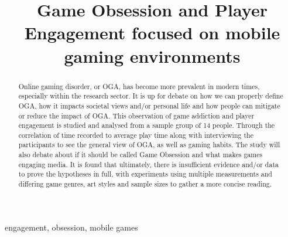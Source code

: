 \documentclass[conference]{IEEEtran}
\begin{document}


\lstset{style=style}

\title{Game Obsession and Player Engagement focused on mobile gaming environments \\
}

\author{
}

\maketitle



\begin{abstract}
Online gaming disorder, or OGA, has become more prevalent in modern times, especially within the research sector. It is up for debate on how we can properly define OGA, how it impacts societal views and/or personal life and how people can mitigate or reduce the impact of OGA. This observation of game addiction and player engagement is studied and analysed from a sample group of 14 people. Through the correlation of time recorded to average play time along with interviewing the participants to see the general view of OGA, as well as gaming habits. The study will also debate about if it should be called Game Obsession and what makes games engaging media. It is found that ultimately, there is insufficient evidence and/or data to prove the hypotheses in full, with experiments using multiple measurements and differing game genres, art styles and sample sizes to gather a more concise reading. 
\end{abstract}
\begin{IEEEkeywords}
engagement, obsession, mobile games
\end{IEEEkeywords}
\end{document}
